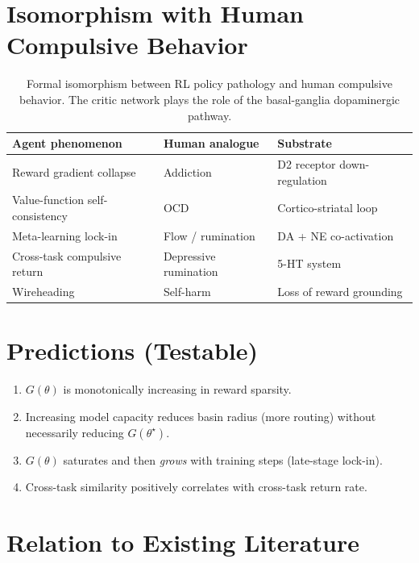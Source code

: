 \documentclass[10pt]{article}
\begin{document}
\section{Isomorphism with Human Compulsive Behavior}

\begin{table}[h]
\centering
\small
\begin{tabular}{lll}
\toprule
\textbf{Agent phenomenon} & \textbf{Human analogue} & \textbf{Substrate}\\
\midrule
Reward gradient collapse          & Addiction           & D2 receptor down-regulation\\
Value-function self-consistency   & OCD                 & Cortico-striatal loop\\
Meta-learning lock-in             & Flow / rumination   & DA + NE co-activation\\
Cross-task compulsive return      & Depressive rumination & 5-HT system\\
Wireheading                      & Self-harm           & Loss of reward grounding\\
\bottomrule
\end{tabular}
\caption{Formal isomorphism between RL policy pathology and human
compulsive behavior. The critic network plays the role of the
basal-ganglia dopaminergic pathway.}
\end{table}

\section{Predictions (Testable)}

\begin{enumerate}
  \item $G(\theta)$ is monotonically increasing in reward sparsity.
  \item Increasing model capacity reduces basin radius (more routing)
        without necessarily reducing $G(\theta^\star)$.
  \item $G(\theta)$ saturates and then \emph{grows} with training steps
        (late-stage lock-in).
  \item Cross-task similarity positively correlates with cross-task
        return rate.
\end{enumerate}

\section{Relation to Existing Literature}
\end{document}
